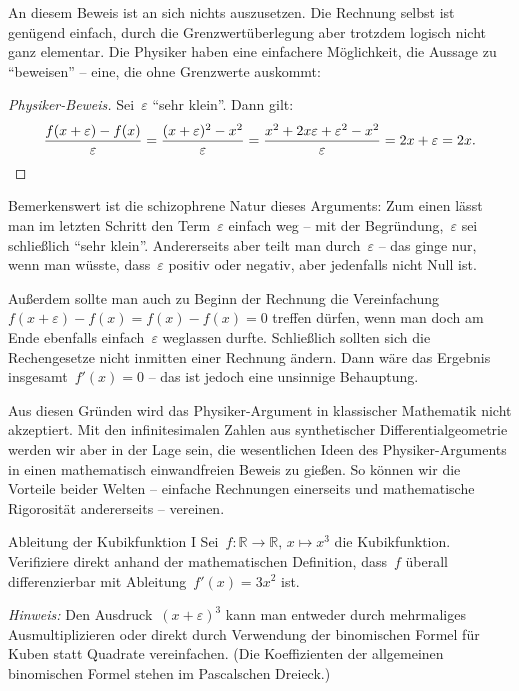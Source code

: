 \documentclass{zirkelblatt}
\newcommand{\RR}{\mathbb{R}}
\theoremstyle{definition}
\theoremstyle{plain}
\theoremstyle{remark}
\begin{document}
An diesem Beweis ist an sich nichts auszusetzen. Die Rechnung selbst ist genügend
einfach, durch die Grenzwertüberlegung aber trotzdem logisch nicht ganz
elementar. Die Physiker haben eine einfachere Möglichkeit, die Aussage zu
"`beweisen"' -- eine, die ohne Grenzwerte auskommt:

\begin{proof}[Physiker-Beweis]Sei~$\varepsilon$ "`sehr klein"'. Dann gilt:
\[ \frac{f(x + \varepsilon) - f(x)}{\varepsilon} =
  \frac{(x + \varepsilon)^2 - x^2}{\varepsilon} =
  \frac{x^2 + 2x\varepsilon + \varepsilon^2 - x^2}{\varepsilon} =
  2x + \varepsilon = 2x. \qedhere \]
\end{proof}

\label{par:schizophren}Bemerkenswert ist die schizophrene Natur dieses Arguments:
Zum einen lässt man im letzten Schritt den Term~$\varepsilon$ einfach weg --
mit der Begründung,~$\varepsilon$ sei schließlich "`sehr klein"'. Andererseits
aber teilt man durch~$\varepsilon$ -- das ginge nur, wenn man wüsste,
dass~$\varepsilon$ positiv oder negativ, aber jedenfalls nicht Null ist.

Außerdem sollte man auch zu Beginn der Rechnung die Vereinfachung~$f(x +
\varepsilon) - f(x) = f(x) - f(x) = 0$ treffen dürfen, wenn man doch am Ende
ebenfalls einfach~$\varepsilon$ weglassen durfte. Schließlich sollten sich die
Rechengesetze nicht inmitten einer Rechnung ändern. Dann wäre das Ergebnis
insgesamt~$f'(x) = 0$ -- das ist jedoch eine unsinnige Behauptung.

Aus diesen Gründen wird das Physiker-Argument in klassischer Mathematik
nicht akzeptiert. Mit den infinitesimalen Zahlen aus synthetischer
Differentialgeometrie werden wir aber in der Lage sein, die wesentlichen Ideen des
Physiker-Arguments in einen mathematisch einwandfreien Beweis zu gießen. So
können wir die Vorteile beider Welten -- einfache Rechnungen einerseits und
mathematische Rigorosität andererseits -- vereinen.

\begin{aufgabeShaded}{Ableitung der Kubikfunktion I}
Sei~$f : \RR \to \RR,\,x \mapsto x^3$ die Kubikfunktion. Verifiziere direkt
anhand der mathematischen Definition, dass~$f$ überall differenzierbar mit
Ableitung~$f'(x) = 3x^2$ ist.

\emph{Hinweis:} Den Ausdruck~$(x + \varepsilon)^3$ kann man entweder durch
mehrmaliges Ausmultiplizieren oder direkt durch Verwendung der binomischen
Formel für Kuben statt Quadrate vereinfachen. (Die Koeffizienten der
allgemeinen binomischen Formel stehen im Pascalschen Dreieck.)
\end{aufgabeShaded}
\end{document}
